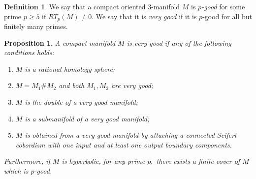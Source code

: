\documentclass[12pt]{amsart}
\newtheorem{prop}[thm]{Proposition}
\theoremstyle{definition}
\newtheorem{dfn}[thm]{Definition}
\begin{document}
\begin{dfn}\label{def:VeryGood}
	We say that a compact oriented $3$-manifold $M$ is \emph{$p$-good} for some prime $p\geq 5$ if $RT_p(M)\neq 0$. We say that it is \emph{very good} if it is $p$-good for all but finitely many primes.
\end{dfn}
\begin{prop}\label{prop:VeryGood}
	A compact manifold $M$ is very good if any of the following conditions holds:
	\begin{enumerate}
		\item $M$ is a rational homology sphere;
		\item $M=M_1\# M_2$ and both $M_1,M_2$ are very good;
		\item $M$ is the double of a very good manifold;
		\item $M$ is a submanifold of a very good manifold; 
		\item $M$ is obtained from a very good manifold by attaching a connected Seifert cobordism with one input and at least one output boundary components.
	\end{enumerate}
	
	Furthermore, if $M$ is hyperbolic, for any prime $p,$ there exists a finite cover of $M$ which is $p$-good.
\end{prop}
\end{document}
